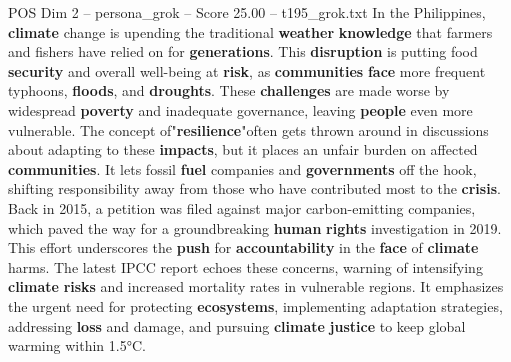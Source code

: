 \begin{textsample}{POS Dim 2 – persona\_grok – Score 25.00 – t195\_grok.txt}  \label{ex:f2_pos_040}
In the Philippines, \textbf{climate} change is upending the traditional \textbf{weather} \textbf{knowledge} that farmers and fishers have relied on for \textbf{generations}.
This \textbf{disruption} is putting food \textbf{security} and overall well-being at \textbf{risk}, as \textbf{communities} \textbf{face} more frequent typhoons, \textbf{floods}, and \textbf{droughts}.
These \textbf{challenges} are made worse by widespread \textbf{poverty} and inadequate governance, leaving \textbf{people} even more vulnerable.
The concept of"\textbf{resilience}"often gets thrown around in discussions about adapting to these \textbf{impacts}, but it places an unfair burden on affected \textbf{communities}.
It lets fossil \textbf{fuel} companies and \textbf{governments} off the hook, shifting responsibility away from those who have contributed most to the \textbf{crisis}.
Back in 2015, a petition was filed against major carbon-emitting companies, which paved the way for a groundbreaking \textbf{human} \textbf{rights} investigation in 2019.
This effort underscores the \textbf{push} for \textbf{accountability} in the \textbf{face} of \textbf{climate} harms.
The latest IPCC report echoes these concerns, warning of intensifying \textbf{climate} \textbf{risks} and increased mortality rates in vulnerable regions.
It emphasizes the urgent need for protecting \textbf{ecosystems}, implementing adaptation strategies, addressing \textbf{loss} and damage, and pursuing \textbf{climate} \textbf{justice} to keep global warming within 1.5°C.

\end{textsample}
